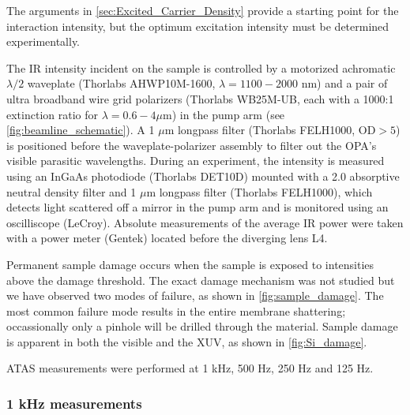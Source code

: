 The arguments in \cref{sec:Excited_Carrier_Density} provide a starting point for the interaction intensity, but the optimum excitation intensity must be determined experimentally.

The IR intensity incident on the sample is controlled by a motorized achromatic $\lambda/2$ waveplate (Thorlabs AHWP10M-1600, $\lambda = 1100 - 2000$ nm) and a pair of ultra broadband wire grid polarizers (Thorlabs WB25M-UB, each with a 1000:1 extinction ratio for $\lambda = 0.6 - 4 \text{} \mu \text{m}$) in the pump arm (see \cref{fig:beamline_schematic}). A 1 $\mu$m longpass filter (Thorlabs FELH1000, $\text{OD}>5$) is positioned before the waveplate-polarizer assembly to filter out the OPA's visible parasitic wavelengths. During an experiment, the intensity is measured using an InGaAs photodiode (Thorlabs DET10D) mounted with a 2.0 absorptive neutral density filter and 1 $\mu$m longpass filter (Thorlabs FELH1000), which detects light scattered off a mirror in the pump arm and is monitored using an oscilliscope (LeCroy). Absolute measurements of the average IR power were taken with a power meter (Gentek) located before the diverging lens L4.

Permanent sample damage occurs when the sample is exposed to intensities above the damage threshold. The exact damage mechanism was not studied but we have observed two modes of failure, as shown in \cref{fig:sample_damage}. The most common failure mode results in the entire membrane shattering; occassionally only a pinhole will be drilled through the material. Sample damage is apparent in both the visible and the XUV, as shown in \cref{fig:Si_damage}. 

ATAS measurements were performed at 1 kHz, 500 Hz, 250 Hz and 125 Hz.

\subsubsection{1 kHz measurements}

